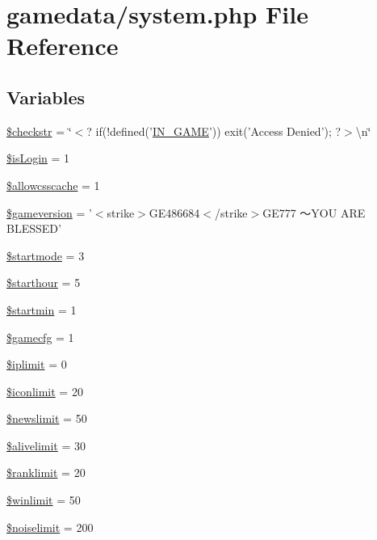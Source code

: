 \hypertarget{system_8php}{\section{gamedata/system.php File Reference}
\label{system_8php}
}
\subsection*{Variables}
\begin{DoxyCompactItemize}
\item 
\hyperlink{system_8php_a42d80f7197ac4a4de30b6fd83b8e3386}{\$checkstr} = \char`\"{}$<$? if(!defined('\hyperlink{templates_2install_8php_a12c82f3d28569a3f80804f1e72cef14c}{I\+N\+\_\+\+G\+A\+M\+E}')) exit('Access Denied'); ?$>$\textbackslash{}n\char`\"{}
\item 
\hyperlink{system_8php_a0685b2eafc663b47272966940e0f63fa}{\$is\+Login} = 1
\item 
\hyperlink{system_8php_a41cecb05679c39ff5461f76d4707ecbb}{\$allowcsscache} = 1
\item 
\hyperlink{system_8php_ab8a69f249ba2d5bd093b97cf8c34d4e9}{\$gameversion} = '$<$strike$>$G\+E486684$<$/strike$>$G\+E777 ～\+Y\+O\+U A\+R\+E B\+L\+E\+S\+S\+E\+D'
\item 
\hyperlink{system_8php_a84f9748242bbe59e5def222a1f731a86}{\$startmode} = 3
\item 
\hyperlink{system_8php_aeef46eda5e8dd04090e31a665bd5122e}{\$starthour} = 5
\item 
\hyperlink{system_8php_abb5a90eac0af0eb8651a13cdedd47b52}{\$startmin} = 1
\item 
\hyperlink{system_8php_a1244ee202d3fb8cb1341ed98c6855f11}{\$gamecfg} = 1
\item 
\hyperlink{system_8php_a310121f5d3ec43f5cfb1cf78d31814ec}{\$iplimit} = 0
\item 
\hyperlink{system_8php_a9929d2e2890538be6fd05ead4bb4aeef}{\$iconlimit} = 20
\item 
\hyperlink{system_8php_a66b46b16c2b88b5bac5a54bcc0bf20e9}{\$newslimit} = 50
\item 
\hyperlink{system_8php_a9579e8fa7e38029b40db1389d73ae37d}{\$alivelimit} = 30
\item 
\hyperlink{system_8php_afa3b8f992d71ff31a70916aba6d974c1}{\$ranklimit} = 20
\item 
\hyperlink{system_8php_a01e2b9fb5d1ed424d631e4e3359f5c51}{\$winlimit} = 50
\item 
\hyperlink{system_8php_a4dc0fb7ebf5e68f895dcc96b970c2a75}{\$noiselimit} = 200

\end{DoxyCompactItemize}
